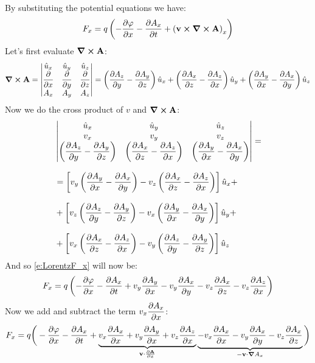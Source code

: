 By substituting the potential equations we have:
\begin{equation} \label{e:LorentzF_x}
  F_x = q \brackets{-\pdv{\potE}{x} - \pdv{A_x}{t} + \brackets{\vec{v} \cross \curl{\vec{A}}}_x}
\end{equation}
Let's first evaluate $\curl{\vb{A}}$:
\begin{equation}
  \curl{\vec{A}} =
  \begin{vmatrix}
  \hat{u}_x & \hat{u}_y & \hat{u}_z \\
  \pdv{}{x} & \pdv{}{y} & \pdv{}{z} \\
  A_x & A_y & A_z
  \end{vmatrix}
  = \left(\pdv{A_z}{y} - \pdv{A_y}{z}\right)\hat{u}_x
  + \left(\pdv{A_x}{z} - \pdv{A_z}{x}\right)\hat{u}_y
  + \left(\pdv{A_y}{x} - \pdv{A_x}{y}\right)\hat{u}_z
\end{equation}
Now we do the cross product of $v$ and $\curl{\vb{A}}$:
\begin{equation}
  \begin{split}
    &\begin{vmatrix}
      \hat{u}_x & \hat{u}_y & \hat{u}_z \\
      v_x & v_y & v_z \\
      \left(\pdv{A_z}{y} - \pdv{A_y}{z}\right) & \left(\pdv{A_x}{z} - \pdv{A_z}{x}\right) & \left(\pdv{A_y}{x} - \pdv{A_x}{y}\right)
    \end{vmatrix}
    = \\[8pt]
      &= \left[v_y \left(\pdv{A_y}{x} - \pdv{A_x}{y}\right) - v_z \left(\pdv{A_x}{z} - \pdv{A_z}{x}\right)\right]\hat{u}_x +\\[8pt]
      &+ \left[v_z \left(\pdv{A_z}{y} - \pdv{A_y}{z}\right) - v_x \left(\pdv{A_y}{x} - \pdv{A_x}{y}\right)\right]\hat{u}_y +\\[8pt]
      &+ \left[v_x \left(\pdv{A_x}{z} - \pdv{A_z}{x}\right) - v_y \left(\pdv{A_z}{y} - \pdv{A_y}{z}\right)\right]\hat{u}_z
  \end{split}
\end{equation}
And so \eqref{e:LorentzF_x} will now be:
\begin{equation}
  F_x = q \brackets{-\pdv{\potE}{x} - \pdv{A_x}{t} + v_y \pdv{A_y}{x} - v_y\pdv{A_x}{y} - v_z \pdv{A_x}{z} - v_z\pdv{A_z}{x}}
\end{equation}
Now we add and subtract the term $v_x \pdv{A_x}{x}$:
\begin{equation}
  F_x = q \bigg(-\pdv{\potE}{x} - \pdv{A_x}{t} + \underbrace{v_x \pdv{A_x}{x} + v_y \pdv{A_y}{x} + v_z\pdv{A_z}{x}}_{\vec{v}\cdot \frac{\partial \vec{A}}{\partial x}} \underbrace{- v_x \pdv{A_x}{x}- v_y\pdv{A_x}{y} - v_z \pdv{A_x}{z}}_{-\vec{v} \cdot \grad{A_x}} \bigg)
\end{equation}
